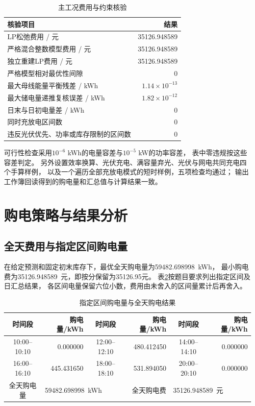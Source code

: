 \documentclass[UTF8,a4paper,12pt,fontset=fandol]{ctexart}
\newcommand{\Cost}{35126.948589}
\newcommand{\GridTotal}{59482.698998}
\begin{document}
\begin{table}[htbp]
  \centering\small
  \caption{主工况费用与约束核验}\label{tab:validation}
  \begin{tabularx}{\linewidth}{Xr}
    \toprule
    核验项目 & 结果\\
    \midrule
    LP松弛费用 / 元 & \Cost\\
    严格混合整数模型费用 / 元 & \Cost\\
    独立重建LP费用 / 元 & \Cost\\
    严格模型相对最优性间隙 & 0\\
    最大母线能量平衡残差 / kWh & $1.14\times10^{-13}$\\
    最大储电量递推复核误差 / kWh & $1.82\times10^{-12}$\\
    日末与日初电量差 / kWh & 0\\
    同时充放电区间数 & 0\\
    违反光伏优先、功率或库存限制的区间数 & 0\\
    \bottomrule
  \end{tabularx}
\end{table}

可行性检查采用$10^{-6}$ kWh的电量容差与$10^{-5}$ kW的功率容差，
表中零违规按这些容差判定。
另外设置效率换算、光伏充电、满容量弃光、光伏与网电共同充电四个手算样例，
以及一个遍历全部充放电模式的短时样例，五项检查均通过；
输出工作簿回读得到的购电量和汇总值与计算结果一致。

\section{购电策略与结果分析}
\subsection{全天费用与指定区间购电量}
在给定预测和固定初末库存下，最优全天购电量为\GridTotal\ kWh，
最小购电费为\Cost\ 元，即按分保留为35126.95元。
表\ref{tab:purchase}按题目要求列出指定区间及日汇总结果，
各区间电量保留六位小数，费用由未舍入的区间量累计后再舍入。

\begin{table}[htbp]
  \centering\small
  \setlength{\tabcolsep}{4pt}
  \caption{指定区间购电量与全天购电结果}\label{tab:purchase}
  \begin{tabular}{crcrcr}
    \toprule
    时间段 & 购电量/kWh & 时间段 & 购电量/kWh & 时间段 & 购电量/kWh\\
    \midrule
    10:00--10:10 & 0.000000 & 12:00--12:10 & 480.412450 & 14:00--14:10 & 0.000000\\
    16:00--16:10 & 445.431650 & 18:00--18:10 & 531.894050 & 20:00--20:10 & 0.000000\\
    \midrule
    全天购电量 & \multicolumn{2}{l}{\GridTotal\ kWh}
      & 全天购电费 & \multicolumn{2}{l}{\Cost\ 元}\\
    \bottomrule
  \end{tabular}
\end{table}
\end{document}

